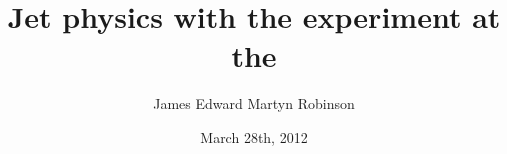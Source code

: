 \documentclass[final]{uclthesis} %
\title{Jet physics with the \ATLAS experiment at the \LHC}
\author{James Edward Martyn Robinson\xspace}
\date{March 28th, 2012}
\begin{document}
\begin{frontmatter}
  
\end{frontmatter}

\begin{mainmatter}
  
  
  
  
  
  
  
  
  
\end{mainmatter}

\begin{appendices}
  
\end{appendices}

\begin{backmatter}
  
\end{backmatter}

\end{document}
